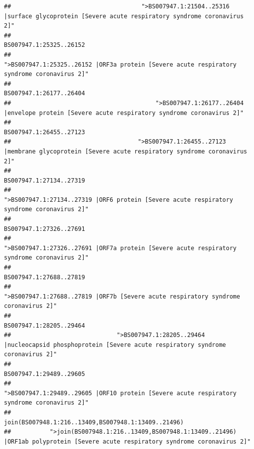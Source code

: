 \documentclass[
]{article}
\begin{document}
\begin{verbatim}
##                                     ">BS007947.1:21504..25316 |surface glycoprotein [Severe acute respiratory syndrome coronavirus 2]" 
##                                                                                                                BS007947.1:25325..26152 
##                                            ">BS007947.1:25325..26152 |ORF3a protein [Severe acute respiratory syndrome coronavirus 2]" 
##                                                                                                                BS007947.1:26177..26404 
##                                         ">BS007947.1:26177..26404 |envelope protein [Severe acute respiratory syndrome coronavirus 2]" 
##                                                                                                                BS007947.1:26455..27123 
##                                    ">BS007947.1:26455..27123 |membrane glycoprotein [Severe acute respiratory syndrome coronavirus 2]" 
##                                                                                                                BS007947.1:27134..27319 
##                                             ">BS007947.1:27134..27319 |ORF6 protein [Severe acute respiratory syndrome coronavirus 2]" 
##                                                                                                                BS007947.1:27326..27691 
##                                            ">BS007947.1:27326..27691 |ORF7a protein [Severe acute respiratory syndrome coronavirus 2]" 
##                                                                                                                BS007947.1:27688..27819 
##                                                    ">BS007947.1:27688..27819 |ORF7b [Severe acute respiratory syndrome coronavirus 2]" 
##                                                                                                                BS007947.1:28205..29464 
##                              ">BS007947.1:28205..29464 |nucleocapsid phosphoprotein [Severe acute respiratory syndrome coronavirus 2]" 
##                                                                                                                BS007947.1:29489..29605 
##                                            ">BS007947.1:29489..29605 |ORF10 protein [Severe acute respiratory syndrome coronavirus 2]" 
##                                                                                    join(BS007948.1:216..13409,BS007948.1:13409..21496) 
##           ">join(BS007948.1:216..13409,BS007948.1:13409..21496) |ORF1ab polyprotein [Severe acute respiratory syndrome coronavirus 2]" 

\end{verbatim}
\end{document}
